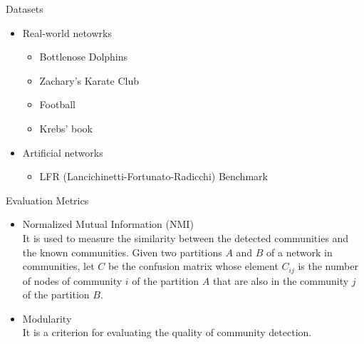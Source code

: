 \documentclass[aspectratio=169,xcolor=dvipsnames]{beamer}
\begin{document}
\begin{frame}{Datasets}
    \begin{itemize}
        \item Real-world netowrks\\
        \begin{itemize}
            \item Bottlenose Dolphins
            \item Zachary's Karate Club
            \item Football
            \item Krebs' book
        \end{itemize}
        \item Artificial networks \\
        \begin{itemize}
            \item LFR (Lancichinetti-Fortunato-Radicchi) Benchmark
        \end{itemize}
    \end{itemize}
\end{frame}


\begin{frame}{Evaluation Metrics}
    \begin{itemize}
        \item Normalized Mutual Information (NMI) \\
        It is used to measure the similarity between the detected communities and the known communities. Given two partitions $A$ and $B$ of a network in communities, let $C$ be the confusion matrix whose element $C_{ij}$ is the number of nodes of community $i$ of the partition $A$ that are also in the community $j$ of the partition $B$.
        \item Modularity \\
        It is a criterion for evaluating the quality of community detection.
    \end{itemize}
\end{frame}

\end{document}
